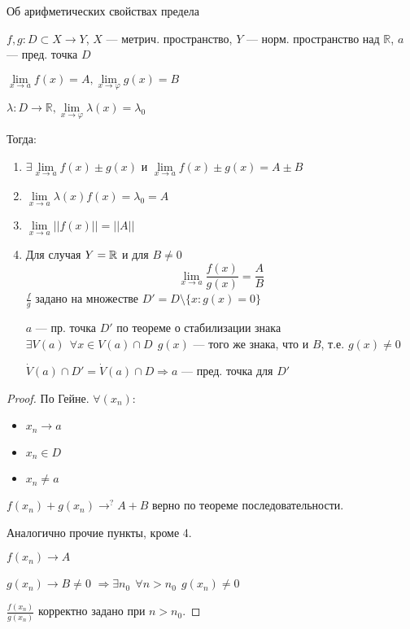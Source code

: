\begin{theorem}
    Об арифметических свойствах предела

    $f,g: D\subset X\to Y$, $X$ --- метрич. пространство, $Y$ --- норм. пространство над $\mathbb{R}$, $a$ --- пред. точка $D$

    $\lim\limits_{x\to a}f(x)=A, \lim\limits_{x\to \varphi}g(x)=B$
    
    $\lambda: D\to \mathbb{R}, \lim\limits_{x\to \varphi}\lambda (x) = \lambda_0$
    
    Тогда:
    \begin{enumerate}
        \item $\exists\lim\limits_{x\to a} f(x)\pm g(x)$ и $\lim\limits_{x\to a} f(x)\pm g(x)=A\pm B$
        \item $\lim\limits_{x\to a} \lambda(x) f(x) = \lambda_0=A$
        \item $\lim\limits_{x\to a} ||f(x)||=||A||$
        \item Для случая $Y=\operatorname*{\mathbb{R}}$ и для $B\not=0$ $$\lim\limits_{x\to a}\frac{f(x)}{g(x)}=\frac{A}{B}$$
        $\frac{f}{g}$ задано на множестве $D'=D\setminus \{x:g(x)=0\}$

        $a$ --- пр. точка $D'$ по теореме о стабилизации знака $\exists V(a) \ \ \forall x\in V(a)\cap D \ \ g(x)$ --- того же знака, что и $B$, т.е. $g(x)\not = 0$

        $\dot V(a)\cap D'=\dot V(a)\cap D \Rightarrow a$ --- пред. точка для $D'$
    \end{enumerate}
\end{theorem}
\begin{proof}
    По Гейне.
    $\forall (x_n):$
    \begin{itemize}
        \itemsep0em
        \item $x_n\to a$
        \item $x_n\in D$
        \item $x_n\not=a$
    \end{itemize}

    $f(x_n) + g(x_n)\to^? A+B$ верно по теореме последовательности.

    Аналогично прочие пункты, кроме 4.

    $f(x_n)\to A$

    $g(x_n)\to B\not=0$
    $\Rightarrow \exists n_0 \ \ \forall n>n_0 \ \ g(x_n)\not=0$

    $\frac{f(x_n)}{g(x_n)}$ корректно задано при $n>n_0$.
\end{proof}
